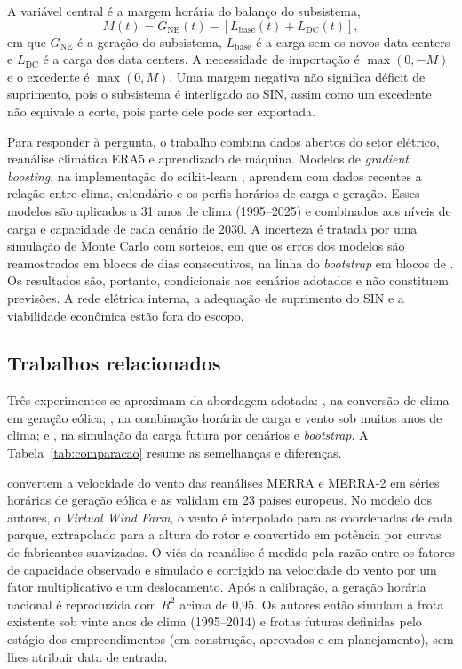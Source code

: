 A variável central é a margem horária do balanço do subsistema,
\begin{equation}
  M(t) = G_{\mathrm{NE}}(t) - \left[ L_{\mathrm{base}}(t) + L_{\mathrm{DC}}(t) \right],
  \label{eq:margem}
\end{equation}
em que $G_{\mathrm{NE}}$ é a geração do subsistema, $L_{\mathrm{base}}$ é a carga sem os novos data centers e $L_{\mathrm{DC}}$ é a carga dos data centers. A necessidade de importação é $\max(0,-M)$ e o excedente é $\max(0,M)$. Uma margem negativa não significa déficit de suprimento, pois o subsistema é interligado ao SIN, assim como um excedente não equivale a corte, pois parte dele pode ser exportada.

Para responder à pergunta, o trabalho combina dados abertos do setor elétrico, reanálise climática ERA5 \parencite{hersbach2020} e aprendizado de máquina. Modelos de \textit{gradient boosting}, na implementação do scikit-learn \parencite{pedregosa2011}, aprendem com dados recentes a relação entre clima, calendário e os perfis horários de carga e geração. Esses modelos são aplicados a 31 anos de clima (1995--2025) e combinados aos níveis de carga e capacidade de cada cenário de 2030. A incerteza é tratada por uma simulação de Monte Carlo com \NSorteios{} sorteios, em que os erros dos modelos são reamostrados em blocos de dias consecutivos, na linha do \textit{bootstrap} em blocos de \textcite{kunsch1989}. Os resultados são, portanto, condicionais aos cenários adotados e não constituem previsões. A rede elétrica interna, a adequação de suprimento do SIN e a viabilidade econômica estão fora do escopo.

\subsection{Trabalhos relacionados}
\label{sec:relacionados}

Três experimentos se aproximam da abordagem adotada: \textcite{staffell2016}, na conversão de clima em geração eólica; \textcite{bloomfield2016}, na combinação horária de carga e vento sob muitos anos de clima; e \textcite{hyndman2010}, na simulação da carga futura por cenários e \textit{bootstrap}. A Tabela~\ref{tab:comparacao} resume as semelhanças e diferenças.

\textcite{staffell2016} convertem a velocidade do vento das reanálises MERRA e MERRA-2 em séries horárias de geração eólica e as validam em 23 países europeus. No modelo dos autores, o \textit{Virtual Wind Farm}, o vento é interpolado para as coordenadas de cada parque, extrapolado para a altura do rotor e convertido em potência por curvas de fabricantes suavizadas. O viés da reanálise é medido pela razão entre os fatores de capacidade observado e simulado e corrigido na velocidade do vento por um fator multiplicativo e um deslocamento. Após a calibração, a geração horária nacional é reproduzida com $R^2$ acima de 0,95. Os autores então simulam a frota existente sob vinte anos de clima (1995--2014) e frotas futuras definidas pelo estágio dos empreendimentos (em construção, aprovados e em planejamento), sem lhes atribuir data de entrada.

